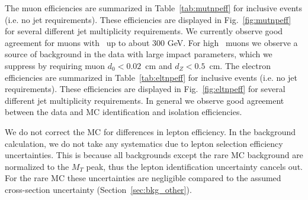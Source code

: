 The muon efficiencies are summarized in Table~\ref{tab:mutnpeff} for inclusive events (i.e. no jet requirements). These efficiencies are displayed in Fig.~\ref{fig:mutnpeff} for
several different jet multiplicity requirements. 
We currently observe good agreement for muons with \pt\ up to about 300 GeV. 
For high \pt\ muons we observe a source of background in the data with large impact parameters, which we suppress by requiring muon $d_0<0.02$~cm and $d_Z<0.5$~cm.
The electron efficiencies are summarized in Table~\ref{tab:eltnpeff} for inclusive events (i.e. no jet requirements). These efficiencies are displayed in Fig.~\ref{fig:eltnpeff} 
for several different jet multiplicity requirements. In general we observe good agreement between the data and MC identification and isolation efficiencies.

We
do not correct the MC for differences in lepton efficiency.  In the
background calculation, we do not take any systematics due to lepton
selection
efficiency uncertainties.  This is because all backgrounds except the 
rare MC background are normalized to the $M_T$ peak, thus the lepton
identification uncertainty cancels out.  For the rare MC these
uncertainties
are negligible compared to the assumed cross-section uncertainty
(Section~\ref{sec:bkg_other}).




